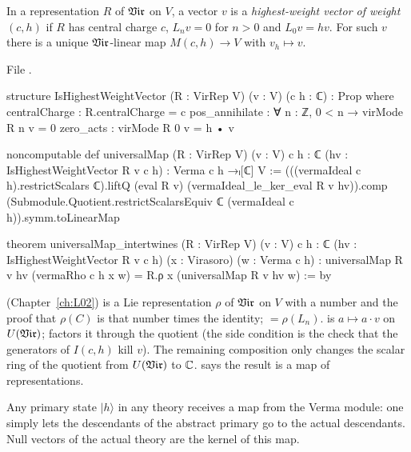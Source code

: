 \begin{definition}\label{l06:def:hwv}
In a representation $R$ of $\mathfrak{Vir}$ on $V$, a vector $v$ is a \emph{highest-weight vector of weight
$(c,h)$} if $R$ has central charge $c$, $L_nv = 0$ for $n>0$ and $L_0v = hv$. For such $v$ there is a
unique $\mathfrak{Vir}$-linear map $M(c,h)\to V$ with $v_h\mapsto v$.
\end{definition}

File .
\begin{leancode}
structure IsHighestWeightVector (R : VirRep V) (v : V) (c h : ℂ) : Prop where
  centralCharge : R.centralCharge = c
  pos_annihilate : ∀ n : ℤ, 0 < n → virMode R n v = 0
  zero_acts : virMode R 0 v = h • v

noncomputable def universalMap (R : VirRep V) (v : V) {c h : ℂ}
    (hv : IsHighestWeightVector R v c h) : Verma c h →ₗ[ℂ] V :=
  (((vermaIdeal c h).restrictScalars ℂ).liftQ (eval R v)
      (vermaIdeal_le_ker_eval R v hv)).comp
    (Submodule.Quotient.restrictScalarsEquiv ℂ (vermaIdeal c h)).symm.toLinearMap

theorem universalMap_intertwines (R : VirRep V) (v : V) {c h : ℂ}
    (hv : IsHighestWeightVector R v c h) (x : Virasoro) (w : Verma c h) :
    universalMap R v hv (vermaRho c h x w) =
      R.ρ x (universalMap R v hv w) := by
\end{leancode}

\begin{dictionary}
 (Chapter~\ref{ch:L02}) is a Lie representation $\rho$ of $\mathfrak{Vir}$ on $V$ with a number
 and the proof that $\rho(C)$ is that number times the identity; 
$= \rho(L_n)$.  is $a\mapsto a\cdot v$ on $U(\mathfrak{Vir})$;  factors it through the
quotient (the side condition  is the check that the generators of $I(c,h)$
kill $v$). The remaining composition only changes the scalar ring of the quotient from $U(\mathfrak{Vir})$ to ${\mathbb{C}}$.
\allowbreak{} says the result is a map of representations.
\end{dictionary}

\begin{physics}
Any primary state $|h\rangle$ in any theory receives a map from the Verma module: one simply lets the
descendants of the abstract primary go to the actual descendants. Null vectors of the actual theory are
the kernel of this map.
\end{physics}

